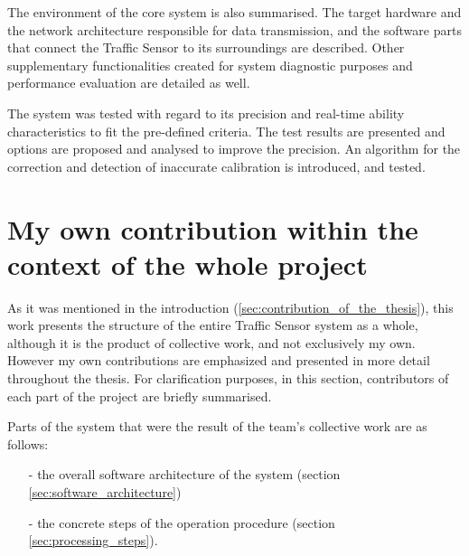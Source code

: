 The environment of the core system is also summarised.
The target hardware and the network architecture responsible for data transmission, and the software parts that connect the Traffic Sensor to its surroundings are described.
Other supplementary functionalities created for system diagnostic purposes and performance evaluation are detailed as well.

The system was tested with regard to its precision and real-time ability characteristics to fit the pre-defined criteria.
The test results are presented and options are proposed and analysed to improve the precision.
An algorithm for the correction and detection of inaccurate calibration is introduced, and tested.

\section{My own contribution within the context of the whole project}
As it was mentioned in the introduction (\ref{sec:contribution_of_the_thesis}), this work presents the structure of the entire Traffic Sensor system as a whole, although it is the product of collective work, and not exclusively my own.
However my own contributions are emphasized and presented in more detail throughout the thesis.
For clarification purposes, in this section, contributors of each part of the project are briefly summarised.

\noindent Parts of the system that were the result of the team's collective work are as follows:
\begin{itemize}
	\item[-] the overall software architecture of the system (section \ref{sec:software_architecture})
	\item[-] the concrete steps of the operation procedure (section \ref{sec:processing_steps}).
\end{itemize}

